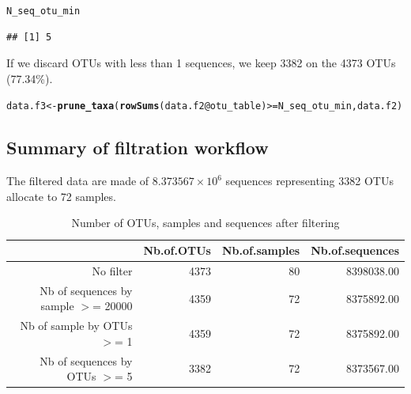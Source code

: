 \documentclass[12pt]{article}\usepackage[]{graphicx}\usepackage[]{color}
\makeatletter
\newcommand{\hlopt}[1]{\textcolor[rgb]{0,0,0}{#1}}%
\newcommand{\hlstd}[1]{\textcolor[rgb]{0.345,0.345,0.345}{#1}}%
\newcommand{\hlkwb}[1]{\textcolor[rgb]{0.69,0.353,0.396}{#1}}%
\newcommand{\hlkwc}[1]{\textcolor[rgb]{0.333,0.667,0.333}{#1}}%
\newcommand{\hlkwd}[1]{\textcolor[rgb]{0.737,0.353,0.396}{\textbf{#1}}}%
\newenvironment{kframe}{%
 \def\at@end@of@kframe{}%
 \ifinner\ifhmode%
  \def\at@end@of@kframe{\end{minipage}}%
  \begin{minipage}{\columnwidth}%
 \fi\fi%
 \def\FrameCommand##1{\hskip\@totalleftmargin \hskip-\fboxsep
 \colorbox{shadecolor}{##1}\hskip-\fboxsep
     \hskip-\linewidth \hskip-\@totalleftmargin \hskip\columnwidth}%
 \MakeFramed {\advance\hsize-\width
   \@totalleftmargin\z@ \linewidth\hsize
   \@setminipage}}%
 {\par\unskip\endMakeFramed%
 \at@end@of@kframe}
\newenvironment{knitrout}{}{} %
\numberwithin{figure}{section}
\makeatother
\begin{document}
\begin{knitrout}\small
{}\color{fgcolor}\begin{kframe}
\begin{alltt}
\hlstd{N_seq_otu_min}
\end{alltt}
\begin{verbatim}
## [1] 5
\end{verbatim}
\end{kframe}
\end{knitrout}

If we discard OTUs with less than 1 sequences, we keep 3382 on the 4373 OTUs (77.34\%).

\begin{knitrout}\small
{}\color{fgcolor}\begin{kframe}
\begin{alltt}
\hlstd{data.f3} \hlkwb{<-} \hlkwd{prune_taxa}\hlstd{(}\hlkwd{rowSums}\hlstd{(data.f2}\hlopt{@}\hlkwc{otu_table}\hlstd{)} \hlopt{>=} \hlstd{N_seq_otu_min, data.f2)}
\end{alltt}
\end{kframe}
\end{knitrout}

\subsection{Summary of filtration workflow}

The filtered data are made of \ensuremath{8.373567\times 10^{6}} sequences representing 3382 OTUs allocate to 72 samples.




\begin{table}[ht]
\centering
\begin{tabular}{rrrr}
  \hline
 & Nb.of.OTUs & Nb.of.samples & Nb.of.sequences \\ 
  \hline
No filter & 4373 &  80 & 8398038.00 \\ 
  Nb of sequences by sample $>$=  20000 & 4359 &  72 & 8375892.00 \\ 
  Nb of sample by OTUs $>$=  1 & 4359 &  72 & 8375892.00 \\ 
  Nb of sequences by OTUs $>$=  5 & 3382 &  72 & 8373567.00 \\ 
   \hline
\end{tabular}
\caption{Number of OTUs, samples and sequences after filtering} 
\end{table}
\end{document}
